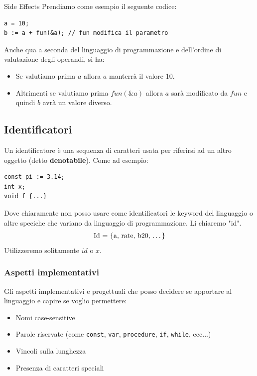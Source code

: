\documentclass[a4paper]{article}
\begin{document}
\begin{Example}{Side Effects}{}
    Prendiamo come esempio il seguente codice:
    \begin{lstlisting}
a = 10; 
b := a + fun(&a); // fun modifica il parametro
\end{lstlisting}
    Anche qua a seconda del linguaggio di programmazione e dell'ordine di valutazione 
    degli operandi, si ha:
    \begin{itemize}
        \item Se valutiamo prima \( a \) allora $a$ manterrà il valore 10.
        \item Altrimenti se valutiamo prima \( fun(\&a) \) allora $a$ sarà modificato da 
        $fun$ e quindi $b$ avrà un valore diverso.
    \end{itemize}
\end{Example}

\subsection{Identificatori}

Un identificatore è una sequenza di caratteri usata per riferirsi 
ad un altro oggetto (detto \textbf{denotabile}). 
Come ad esempio:
\begin{lstlisting}
const pi := 3.14;
int x; 
void f {...}
\end{lstlisting}
Dove chiaramente non posso usare come identificatori 
le keyword del linguaggio o altre speciche che variano da linguaggio di programmazione.
Li chiaremo "id". 
\[
  \text{Id = \{a, rate, b20, \dots\}}
\]
Utilizzeremo solitamente $id$ o $x$. 

\subsubsection{Aspetti implementativi}
  
Gli aspetti implementativi e progettuali che posso decidere se apportare al linguaggio e capire
se voglio permettere:
\begin{itemize}
  \item Nomi case-sensitive
  \item Parole riservate (come \texttt{const}, \texttt{var}, \texttt{procedure}, \texttt{if}, \texttt{while}, ecc...)
  \item Vincoli sulla lunghezza 
  \item Presenza di caratteri speciali
\end{itemize}
\end{document}
